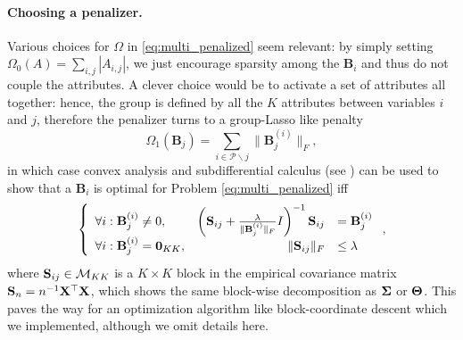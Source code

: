 \paragraph{Choosing  a penalizer.}   Various choices  for $\Omega$  in
\eqref{eq:multi_penalized}   seem   relevant:    by   simply   setting
$\Omega_0(A) = \sum_{i,j} |A_{i,j}|$, we just encourage sparsity among
the $\mathbf{B}_i$  and thus do  not couple the attributes.   A clever
choice would be to activate a set of attributes all together: hence, the
group is defined  by all the $K$ attributes between  variables $i$ and $j$,
therefore the penalizer turns to a group-Lasso like penalty
\begin{equation}
  \label{eq:penalty_grp_variate}
  \Omega_1(\mathbf{B}_j) = \sum_{i \in \mathcal{P}\backslash j} \|\mathbf{B}_j^{(i)}\|_F,
\end{equation}
in  which  case  convex  analysis  and  subdifferential  calculus  (see
\cite{2006_CO_Boyd})  can be  used to  show that  a $\mathbf{B}_i$  is
optimal for Problem \eqref{eq:multi_penalized} iff
\begin{equation}
  \label{eq:optimality}
  \left\{\begin{array}{lrl}
      \forall i : \mathbf{B}_j^{(i)} \neq 0, & \left(\mathbf{S}_{ij} +
        \frac{\lambda}{\|\mathbf{B}_j^{(i)}\|_F           }          I
      \right)^{-1} \mathbf{S}_{ij} & = \mathbf{B}_j^{(i)} \\ 
      \forall i : \mathbf{B}_j^{(i)} = \bzr_{KK}, & 
      \| \mathbf{S}_{ij} \|_F & \leq \lambda \\
  \end{array}\right.,
\end{equation}
where  $\mathbf{S}_{ij}\in\mathcal{M}_{KK}$ is  a  $K\times K$  block in  the
empirical covariance matrix $\mathbf{S}_n  = n^{-1} \mathbf{X}^\top\mathbf{X}$, which shows
the  same block-wise  decomposition as  ${\boldsymbol\Sigma}$ or  $\boldsymbol\Theta$.  This
paves  the way  for  an optimization  algorithm like  block-coordinate
descent which we implemented, although we omit details here. 


